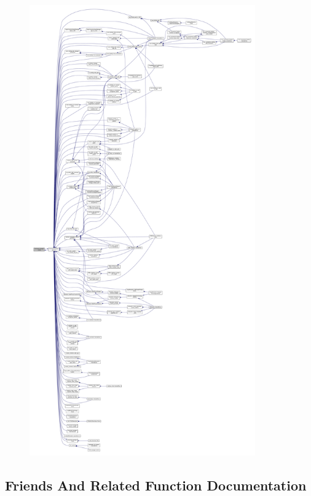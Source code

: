 \begin{figure}[H]
\begin{center}
\leavevmode
\includegraphics[height=550pt]{d7/d6b/classstructural__manager_a1357e1db0d3895ee2fd084a109f242d7_icgraph}
\end{center}
\end{figure}


\subsection{Friends And Related Function Documentation}
\mbox{\label{classstructural__manager_a0f747b30364b9fac0b9ced28b1631f32}} 
